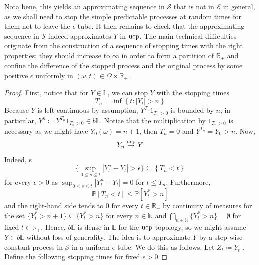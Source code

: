 \documentclass[11pt,a4paper,twoside,openany]{report}
\numberwithin{equation}{section}
\theoremstyle{plain} %
\theoremstyle{definition} %
\theoremstyle{remark} %
\begin{document}
Nota bene, this yields an approximating sequence in \(\mathcal{S}\) that is not in \(\mathcal{E}\) in general, as we shall need to stop the simple predictable processes at random times for them not to leave the \(\epsilon\)-tube. It then remains to check that the approximating sequence in \(\mathcal{S}\) indeed approximates \(Y\) in \(\rm{ucp}\). The main technical difficulties originate from the construction of a sequence of stopping times with the right properties; they should increase to \(\infty\) in order to form a partition of \(\mathbb{R}_+\) and confine the difference of the stopped process and the original process by some positive \(\epsilon\) uniformly in \((\omega,t)\in\Omega\times\mathbb{R}_+\). 
\begin{proof}
 First, notice that for \(Y\in\mathbb{L}\), we can stop \(Y\) with the stopping times 
    \begin{equation*}
        T_n=\inf\left\{t:|Y_t|>n\right\}
    \end{equation*}
    Because \(Y\) is left-continuous by assumption, \(Y^{T_n}1_{T_n>0}\) is bounded by \(n\); in particular, \(Y^n\coloneqq Y^{T_n}1_{T_n>0}\in b\mathbb{L}\). Notice that the multiplication by \(1_{T_n>0}\) is necessary as we might have \(Y_0(\omega)=n+1\), then \(T_n=0\) and \(Y^{T_n}=Y_0>n\). Now,
    \begin{equation*}
        Y_n\overset{\rm{ucp}}{\to}Y
    \end{equation*}
 Indeed,
s    \begin{equation*}
        \Big\{\sup_{0\leq s\leq t}|Y_t^n-Y_t|>\epsilon\Big\}\subseteq \left\{T_n< t\right\}
    \end{equation*}
    for every \(\epsilon>0\) as \(\sup_{0\leq s\leq t}|Y_t^n-Y_t|=0\) for \(t\leq T_n\). Furthermore, 
    \begin{equation*}
        \mathbb{P}[T_n< t]\leq\mathbb{P}[Y_t^*>n]
    \end{equation*}
    and the right-hand side tends to \(0\) for every \(t\in\mathbb{R}_+\) by continuity of measures for the set \(\{Y_t^*>n+1\}\subseteq\{Y_t^*>n\}\) for every \(n\in\mathbb{N}\) and \(\bigcap_{n\in\mathbb{N}}\{Y_t^*>n\}=\emptyset\) for fixed \(t\in\mathbb{R}_+\). Hence, \(b\mathbb{L}\) is dense in \(\mathbb{L}\) for the \(\rm{ucp}\)-topology, so we might assume \(Y\in b\mathbb{L}\) without loss of generality. The idea is to approximate \(Y\) by a step-wise constant process in \(\mathcal{S}\) in a uniform \(\epsilon\)-tube. We do this as follows. Let 
    \(Z_t\coloneqq Y_t^{+}\). Define the following stopping times for fixed \(\epsilon>0\)

\end{proof}
\end{document}
